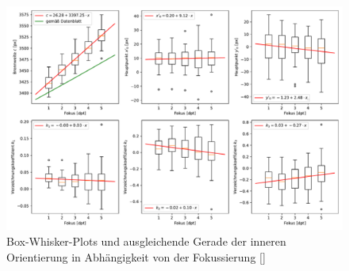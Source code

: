 \documentclass[./00PhotoBox.tex]{subfiles}
\begin{document}
\begin{figure}
    \centering
    \includegraphics[width=1\textwidth]{./img/6_kalibrierung/naeherungswerte_diagramm.pdf}
    \caption{Box-Whisker-Plots und ausgleichende Gerade der inneren Orientierung in Abhängigkeit von der Fokussierung []}
    \label{img:naeherungswerte}
\end{figure}

\biblio
\end{document}
